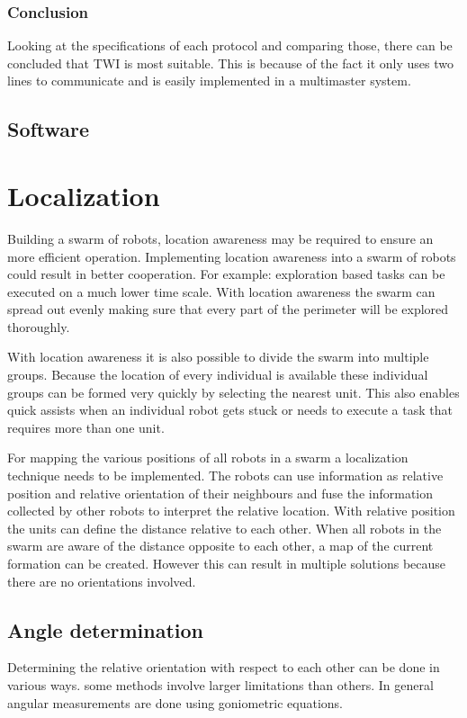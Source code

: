 \documentclass[10pt,a4paper]{article}
\begin{document}
\subsubsection{Conclusion}
Looking at the specifications of each protocol and comparing those, there can be concluded that TWI is most suitable. This is because of the fact it only uses two lines to communicate and is easily implemented in a multimaster system.


\subsection{Software}


\newpage
\section{Localization}
Building a swarm of robots, location awareness may be required to ensure an more efficient operation. Implementing location awareness into a swarm of robots could result in better cooperation. For example: exploration based tasks can be executed on a much lower time scale. With location awareness the swarm can spread out evenly making sure that every part of the perimeter will be explored thoroughly. 

With location awareness it is also possible to divide the swarm into multiple groups. Because the location of every individual is available these individual groups can be formed very quickly by selecting the nearest unit. This also enables quick assists when an individual robot gets stuck or needs to execute a task that requires more than one unit.

For mapping the various positions of all robots in a swarm a localization technique needs to be implemented. The robots can use information as relative position and relative orientation of their neighbours and fuse the information collected by other robots to interpret the relative location. With relative position the units can define the distance relative to each other. When all robots in the swarm are aware of the distance opposite to each other, a map of the current formation can be created. However this can result in multiple solutions because there are no orientations involved. 

\subsection{Angle determination}
Determining the relative orientation with respect to each other can be done in various ways. some methods involve larger limitations than others. In general angular measurements are done using goniometric equations.
\end{document}
